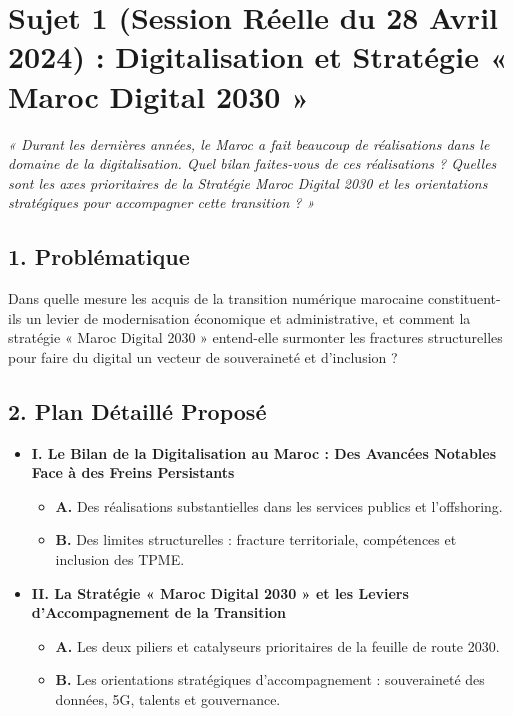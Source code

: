\section{Sujet 1 (Session Réelle du 28 Avril 2024) : Digitalisation et Stratégie « Maroc Digital 2030 »}

\begin{tcolorbox}[colback=blue!5!white,colframe=blue!75!black,title=\textbf{Énoncé Officiel du Sujet (28 Avril 2024)}]
\textit{« Durant les dernières années, le Maroc a fait beaucoup de réalisations dans le domaine de la digitalisation. Quel bilan faites-vous de ces réalisations ? Quelles sont les axes prioritaires de la Stratégie Maroc Digital 2030 et les orientations stratégiques pour accompagner cette transition ? »}
\end{tcolorbox}

\subsection*{1. Problématique}
Dans quelle mesure les acquis de la transition numérique marocaine constituent-ils un levier de modernisation économique et administrative, et comment la stratégie « Maroc Digital 2030 » entend-elle surmonter les fractures structurelles pour faire du digital un vecteur de souveraineté et d'inclusion ?

\subsection*{2. Plan Détaillé Proposé}
\begin{itemize}
    \item \textbf{I. Le Bilan de la Digitalisation au Maroc : Des Avancées Notables Face à des Freins Persistants}
    \begin{itemize}
        \item \textbf{A.} Des réalisations substantielles dans les services publics et l'offshoring.
        \item \textbf{B.} Des limites structurelles : fracture territoriale, compétences et inclusion des TPME.
    \end{itemize}
    \item \textbf{II. La Stratégie « Maroc Digital 2030 » et les Leviers d'Accompagnement de la Transition}
    \begin{itemize}
        \item \textbf{A.} Les deux piliers et catalyseurs prioritaires de la feuille de route 2030.
        \item \textbf{B.} Les orientations stratégiques d'accompagnement : souveraineté des données, 5G, talents et gouvernance.
    \end{itemize}
\end{itemize}

